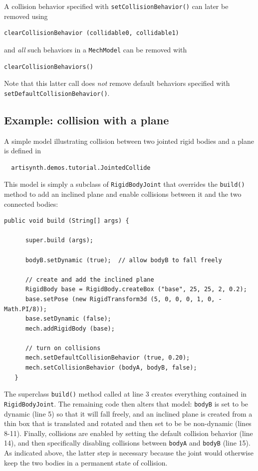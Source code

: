 A collision behavior specified with
{\tt setCollisionBehavior()} can later be removed
using 
%
\begin{lstlisting}[]
  clearCollisionBehavior (collidable0, collidable1)
\end{lstlisting}
%
and {\it all} such behaviors in a {\tt MechModel} can be removed with
%
\begin{lstlisting}[]
  clearCollisionBehaviors()
\end{lstlisting}
%
Note that this latter call does {\it not} remove default behaviors
specified with {\tt setDefaultCollisionBehavior()}.

\subsection{Example: collision with a plane}
\label{JointedCollide:sec}

A simple model illustrating collision between two jointed rigid bodies
and a plane is defined in
%
\begin{verbatim}
  artisynth.demos.tutorial.JointedCollide
\end{verbatim}
%

This model is simply a subclass of {\tt RigidBodyJoint} that
overrides the {\tt build()} method 
to add an inclined plane and enable collisions between it and
the two connected bodies:
%
\lstset{numbers=left}
\begin{lstlisting}[]
   public void build (String[] args) {

      super.build (args);

      bodyB.setDynamic (true);  // allow bodyB to fall freely

      // create and add the inclined plane
      RigidBody base = RigidBody.createBox ("base", 25, 25, 2, 0.2);
      base.setPose (new RigidTransform3d (5, 0, 0, 0, 1, 0, -Math.PI/8));
      base.setDynamic (false);
      mech.addRigidBody (base);

      // turn on collisions
      mech.setDefaultCollisionBehavior (true, 0.20);
      mech.setCollisionBehavior (bodyA, bodyB, false);
   }
\end{lstlisting}
\lstset{numbers=none}

The superclass {\tt build()} method called at line 3 creates
everything contained in {\tt RigidBodyJoint}. The remaining code then
alters that model: {\tt bodyB} is set to be dynamic (line 5) so that
it will fall freely, and an inclined plane is created from a thin box
that is translated and rotated and then set to be be non-dynamic
(lines 8-11).  Finally, collisions are enabled by setting the default
collision behavior (line 14), and then specifically disabling
collisions between {\tt bodyA} and {\tt bodyB} (line 15). As indicated
above, the latter step is necessary because the joint would otherwise
keep the two bodies in a permanent state of collision.

